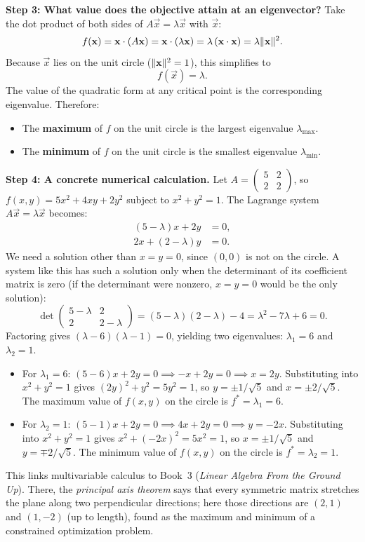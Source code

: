 \begin{example}
\textbf{Step 3: What value does the objective attain at an eigenvector?}
Take the dot product of both sides of $A \vec{x} = \lambda \vec{x}$ with $\vec x$:
\[
f(\mathbf{x})=\mathbf{x}\cdot (A \mathbf{x}) = \mathbf{x}\cdot (\lambda \mathbf{x}) = \lambda\, (\mathbf{x}\cdot \mathbf{x}) = \lambda\lVert\mathbf{x}\rVert^2.
\]
Because $\vec{x}$ lies on the unit circle ($\lVert\mathbf{x}\rVert^2 = 1$), this simplifies to
\[
f(\vec{x}) = \lambda.
\]
The value of the quadratic form at any critical point is the corresponding eigenvalue. Therefore:
\begin{itemize}
\item The \textbf{maximum} of $f$ on the unit circle is the largest eigenvalue $\lambda_{\max}$.
\item The \textbf{minimum} of $f$ on the unit circle is the smallest eigenvalue $\lambda_{\min}$.
\end{itemize}

\textbf{Step 4: A concrete numerical calculation.}
Let $A = \begin{pmatrix} 5 & 2 \\ 2 & 2 \end{pmatrix}$, so $f(x,y) = 5x^2 + 4xy + 2y^2$ subject to $x^2 + y^2 = 1$. The Lagrange system $A\vec{x} = \lambda\vec{x}$ becomes:
\begin{align*}
(5 - \lambda)x + 2y &= 0, \\
2x + (2 - \lambda)y &= 0.
\end{align*}
We need a solution other than $x=y=0$, since $(0,0)$ is not on the circle. A system like this has such a solution only when the determinant of its coefficient matrix is zero (if the determinant were nonzero, $x=y=0$ would be the only solution):
\[
\det \begin{pmatrix} 5 - \lambda & 2 \\ 2 & 2 - \lambda \end{pmatrix} = (5 - \lambda)(2 - \lambda) - 4 = \lambda^2 - 7\lambda + 6 = 0.
\]
Factoring gives $(\lambda - 6)(\lambda - 1) = 0$, yielding two eigenvalues: $\lambda_1 = 6$ and $\lambda_2 = 1$.
\begin{itemize}
\item For $\lambda_1 = 6$: $(5 - 6)x + 2y = 0 \implies -x + 2y = 0 \implies x = 2y$. 
Substituting into $x^2 + y^2 = 1$ gives $(2y)^2 + y^2 = 5y^2 = 1$, so $y = \pm 1/\sqrt{5}$ and $x = \pm 2/\sqrt{5}$. 
The maximum value of $f(x,y)$ on the circle is $f^* = \lambda_1 = 6$.
\item For $\lambda_2 = 1$: $(5 - 1)x + 2y = 0 \implies 4x + 2y = 0 \implies y = -2x$. 
Substituting into $x^2 + y^2 = 1$ gives $x^2 + (-2x)^2 = 5x^2 = 1$, so $x = \pm 1/\sqrt{5}$ and $y = \mp 2/\sqrt{5}$. 
The minimum value of $f(x,y)$ on the circle is $f^* = \lambda_2 = 1$.
\end{itemize}
This links multivariable calculus to Book~3 (\emph{Linear Algebra From the Ground Up}). There, the \emph{principal axis theorem} says that every symmetric matrix stretches the plane along two perpendicular directions; here those directions are $(2,1)$ and $(1,-2)$ (up to length), found as the maximum and minimum of a constrained optimization problem.
\end{example}

